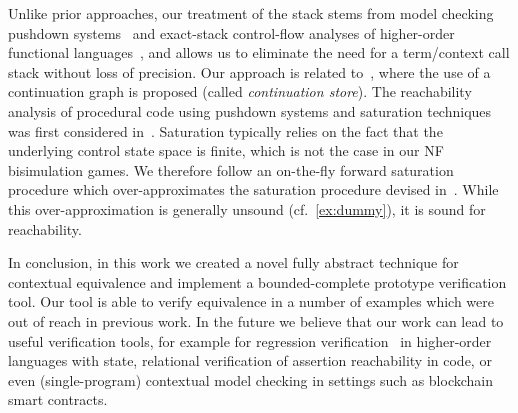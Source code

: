 Unlike prior approaches, our treatment of the stack stems from model checking pushdown systems~\cite{BouajjaniEM97,FinkelWW97,Schwoon02} and exact-stack control-flow analyses of higher-order functional languages~\cite{P4F,CFA2-jour,PDCFA,AAC}, and allows us to
eliminate the need for a term/context call stack without loss of precision.
Our approach is related to~\cite{P4F}, where the use of a continuation graph
is proposed (called \emph{continuation store}). 
The reachability analysis of procedural code using pushdown systems and saturation techniques was first considered in~\cite{EsparzaKS01,Schwoon02}. Saturation typically relies on the fact that the underlying control state space is finite, which is not the case in our NF bisimulation games. We therefore follow an on-the-fly forward saturation procedure which over-approximates the saturation procedure devised in~\cite{FinkelWW97}. While this over-approximation is generally unsound (cf.~\cref{ex:dummy}), it is sound for reachability.
 
In conclusion, in this work we created a novel
fully abstract technique for contextual equivalence and implement a
bounded-complete prototype verification tool. Our tool is able to verify equivalence in a number of examples which were out of reach in previous work.
%
In the future we believe that our work can lead to useful verification tools, for example for regression verification~\cite{regressionverif,rvt,reve,symdiff} in higher-order languages with state, relational verification of assertion reachability in code, or even (single-program) contextual model checking in settings such as blockchain smart contracts.


%  
%
%
%  

